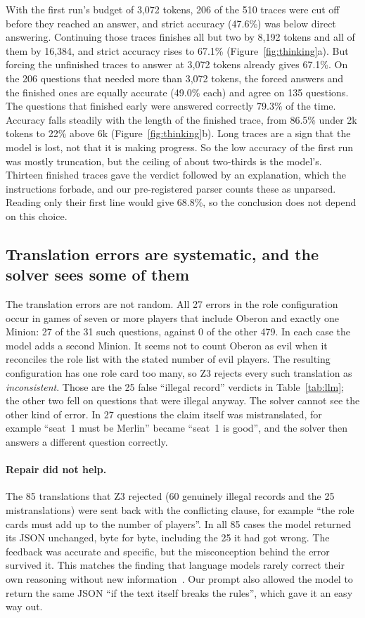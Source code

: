 \documentclass[runningheads]{llncs}
\newcommand{\vd}[1]{\emph{#1}}             %
\begin{document}
With the first run's budget of 3,072 tokens, 206 of the 510 traces were cut off before they reached an answer, and
strict accuracy (47.6\%) was below direct answering. Continuing those traces finishes all but two by 8,192 tokens and
all of them by 16,384, and strict accuracy rises to 67.1\% (Figure~\ref{fig:thinking}a). But forcing the unfinished
traces to answer at 3,072 tokens already gives 67.1\%. On the 206 questions that needed more than 3,072 tokens, the
forced answers and the finished ones are equally accurate (49.0\% each) and agree on 135 questions. The questions
that finished early were answered correctly 79.3\% of the time.
Accuracy falls steadily with the length of the finished trace, from 86.5\% under 2k tokens to 22\% above 6k
(Figure~\ref{fig:thinking}b). Long traces are a sign that the model is lost, not that it is making progress.
So the low accuracy of the first run was mostly truncation, but the ceiling of about two-thirds is the model's.
Thirteen finished traces gave the verdict followed by an explanation, which the instructions forbade, and our
pre-registered parser counts these as unparsed. Reading only their first line would give 68.8\%, so the conclusion
does not depend on this choice.

\subsection{Translation errors are systematic, and the solver sees some of them}\label{sec:llm-errors}
The translation errors are not random. All 27 errors in the role configuration occur in games of seven or more
players that include Oberon and exactly one Minion: 27 of the 31 such questions, against 0 of the other 479. In each
case the model adds a second Minion. It seems not to count Oberon as evil when it reconciles the role list with the
stated number of evil players. The resulting configuration has one role card too many, so Z3 rejects every such
translation as \vd{inconsistent}. Those are the 25 false ``illegal record'' verdicts in Table~\ref{tab:llm}; the other
two fell on questions that were illegal anyway. The solver cannot see the other kind of error. In 27 questions the
claim itself was mistranslated, for example ``seat~1 must be Merlin'' became ``seat~1 is good'', and the solver then
answers a different question correctly.

\paragraph{Repair did not help.}
The 85 translations that Z3 rejected (60 genuinely illegal records and the 25 mistranslations) were sent back with
the conflicting clause, for example ``the role cards must add up to the number of players''. In all 85 cases the
model returned its JSON unchanged, byte for byte, including the 25 it had got wrong. The feedback was accurate and
specific, but the misconception behind the error survived it. This matches the finding that language models rarely
correct their own reasoning without new information~\cite{huang2024selfcorrect}. Our prompt also allowed the model to
return the same JSON ``if the text itself breaks the rules'', which gave it an easy way out.
\end{document}
